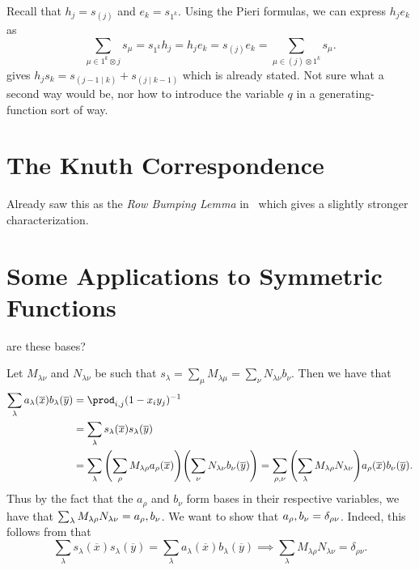 \documentclass[letterpaper, 11pt, oneside]{book}
\begin{document}
\begin{sol}\label{ex:Manivel_1.2.15}
  Recall that $h_{j} = s_{(j)}$ and $e_{k} = s_{1^{k}}$.
  Using the Pieri formulas, we can express $h_{j}e_{k}$ as
  \[
       \sum_{\mu \in 1^{k} \otimes j} s_{\mu} = s_{1^{k}}h_{j} = h_{j}e_{k} = s_{(j)}e_{k} = \sum_{\mu \in (j) \otimes 1^{k}} s_{\mu}.
  \]
   gives $h_{j}s_{k} = s_{(j - 1 \mid k)} + s_{(j \mid k - 1)}$ which is already stated.
  Not sure what a second way would be, nor how to introduce the variable $q$ in a generating-function sort of way.
\end{sol}

\clearpage

\section{The Knuth Correspondence}

\begin{sol}\label{ex:Manivel_1.3.1}
  Already saw this as the \emph{Row Bumping Lemma} in~\cite{book:YT} which gives a slightly stronger characterization.
\end{sol}

\section{Some Applications to Symmetric Functions}

\begin{sol}\label{ex:Manivel_1.4.4}
   are these bases?

  Let $M_{\lambda \nu}$ and $N_{\lambda \nu}$ be such that $s_{\lambda} = \sum_{\mu} M_{\lambda \mu} = \sum_{\nu} N_{\lambda \nu} b_{\nu}$.
  Then we have that
  \begin{align*}
    \sum_{\lambda} a_{\lambda}(\overline{x}) b_{\lambda}(\overline{y}) &= \prod_{i, j} (1 - x_{i}y_{j})^{-1} \\
                                                                       &= \sum_{\lambda} s_{\lambda}(\overline{x})s_{\lambda}(\overline{y}) \\
                                                                       &= \sum_{\lambda} \pqty{\sum_{\rho} M_{\lambda \rho} a_{\rho}(\overline{x})} \pqty{\sum_{\nu} N_{\lambda \nu} b_{\nu}(\overline{y})} = \sum_{\rho, \nu} \pqty{\sum_{\lambda} M_{\lambda \rho} N_{\lambda \nu}} a_{\rho}(\overline{x}) b_{\nu}(\overline{y}).
  \end{align*}
  Thus by the fact that the $a_{\rho}$ and $b_{\nu}$ form bases in their respective variables, we have that $\sum_{\lambda} M_{\lambda \rho} N_{\lambda \nu} = \inner{a_{\rho}, b_{\nu}}$.
  We want to show that $\inner{a_{\rho}, b_{\nu}} = \delta_{\rho \nu}$.
  Indeed, this follows from that
  \[
    \sum_{\lambda} s_{\lambda}(\overline{x}) s_{\lambda}(\overline{y}) = \sum_{\lambda} a_{\lambda}(\overline{x}) b_{\lambda}(\overline{y}) \implies \sum_{\lambda} M_{\lambda \rho} N_{\lambda \nu} = \delta_{\rho \nu}.
  \]
\end{sol}
\end{document}
